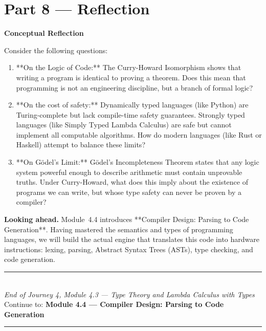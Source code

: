 \documentclass[12pt, a4paper]{book}
\begin{document}
\newpage

\section{Part 8 --- Reflection}

\begin{reflectionbox}
\textbf{Conceptual Reflection}

Consider the following questions:
\begin{enumerate}
  \item **On the Logic of Code:** The Curry-Howard Isomorphism shows that writing a program is identical to proving a theorem. Does this mean that programming is not an engineering discipline, but a branch of formal logic?
  \item **On the cost of safety:** Dynamically typed languages (like Python) are Turing-complete but lack compile-time safety guarantees. Strongly typed languages (like Simply Typed Lambda Calculus) are safe but cannot implement all computable algorithms. How do modern languages (like Rust or Haskell) attempt to balance these limits?
  \item **On Gödel's Limit:** Gödel's Incompleteness Theorem states that any logic system powerful enough to describe arithmetic must contain unprovable truths. Under Curry-Howard, what does this imply about the existence of programs we can write, but whose type safety can never be proven by a compiler?
\end{enumerate}
\end{reflectionbox}

\medskip
\noindent\textbf{Looking ahead.}
Module~4.4 introduces **Compiler Design: Parsing to Code Generation**. Having mastered the semantics and types of programming languages, we will build the actual engine that translates this code into hardware instructions: lexing, parsing, Abstract Syntax Trees (ASTs), type checking, and code generation.

\vspace{1.4cm}
\begin{center}
{\color{JourneyColor}\rule{0.5\linewidth}{0.8pt}}\\[6pt]
{\small\color{JourneyColor}\textit{End of Journey 4, Module 4.3 --- Type Theory and Lambda Calculus with Types}}\\[4pt]
{\small\color{JourneyColor}Continue to: \textbf{Module 4.4 --- Compiler Design: Parsing to Code Generation}}\\[6pt]
{\color{JourneyColor}\rule{0.5\linewidth}{0.8pt}}
\end{center}
\end{document}
